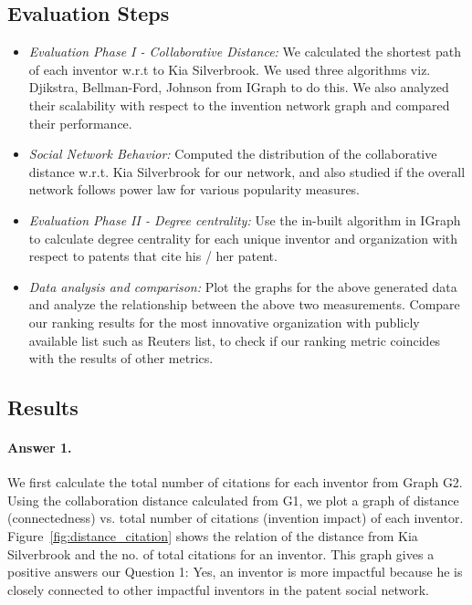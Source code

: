 \subsection{Evaluation Steps}
	\begin{itemize}
		\squish
		\item {\em Evaluation Phase I - Collaborative Distance:} We calculated the 
		shortest path of each inventor w.r.t to Kia Silverbrook. We used three
		algorithms viz. Djikstra, Bellman-Ford, Johnson from IGraph to do this. We
		also analyzed their scalability with respect to the invention network graph
		and compared their performance.
		\item {\em Social Network Behavior:} Computed the distribution of the 
		collaborative distance w.r.t. Kia Silverbrook for our network, and also studied
		if the overall network follows power law for various popularity measures.
		\item {\em Evaluation Phase II - Degree centrality:} Use the in-built
		algorithm in IGraph to calculate degree centrality
		for each unique inventor and organization with respect to patents that cite his / her patent.
		\item {\em Data analysis and comparison:} Plot the graphs for the above
		generated data and analyze the relationship between the above two
		measurements. Compare our ranking results for the most innovative organization
		with publicly available list such as Reuters list, to check if our ranking
		metric coincides with the results of other metrics.
	\end{itemize}



\subsection{Results}

\paragraph{Answer 1.}
We first calculate the total number of citations for each inventor from Graph G2. Using the collaboration distance calculated from G1, we plot a graph of distance (connectedness) vs. total number of citations (invention impact) of each inventor. 
Figure~\ref{fig:distance_citation} shows the relation of the distance from
Kia Silverbrook and the no. of total citations for an inventor. This graph gives a positive answers our Question 1: 
Yes, an inventor is more impactful because he is closely
connected to other impactful inventors in the patent social network.

